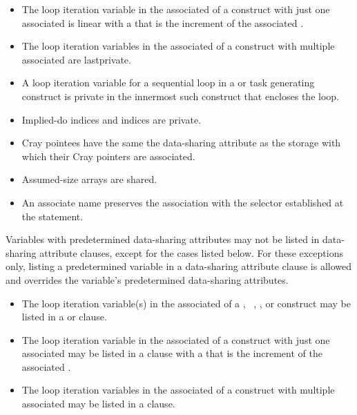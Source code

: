 {{{{\begin{itemize}
\item The loop iteration variable in the associated  of a  construct with just 
one associated  is linear with a  that is the increment of
the associated .

\item The loop iteration variables in the associated  of a  construct with 
multiple associated  are lastprivate. 

\item A loop iteration variable for a sequential loop in a  or task generating construct is 
private in the innermost such construct that encloses the loop.

\item Implied-do indices and  indices are private. 

\item Cray pointees have the same the data-sharing attribute as the storage with which their Cray 
pointers are associated.

\item Assumed-size arrays are shared.
\nopagebreak
\item An associate name preserves the association with the selector established at the 
 statement.
\end{itemize}
\fortranspecificend

Variables with predetermined data-sharing attributes may not be listed in data-sharing 
attribute clauses, except for the cases listed below. For these exceptions only, listing a 
predetermined variable in a data-sharing attribute clause is allowed and overrides the 
variable's predetermined data-sharing attributes.

\ccppspecificstart
\begin{itemize}
\item The loop iteration variable(s) in the associated  of a , 
~, , or  construct may be listed in a  or  clause.

\item The loop iteration variable in the associated  of a  construct with just 
one associated  may be listed in a  clause with a
that is the increment of the associated .

\item The loop iteration variables in the associated  of a  construct with 
multiple associated  may be listed in a  clause. 


\end{itemize}}}}}
